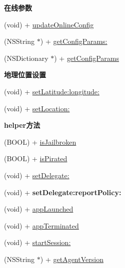\begin{Indent}\textbf{ 在线参数}\par
{\em 

 

 }\begin{DoxyCompactItemize}
\item 
(void) + \hyperlink{interfaceMobClick_a5aff901d6282cd004ce00db11000c3e0}{update\+Online\+Config}
\item 
(N\+S\+String $\ast$) + \hyperlink{interfaceMobClick_ad1a63bdab1a21d495a767929d41cf0ef}{get\+Config\+Params\+:}
\item 
(N\+S\+Dictionary $\ast$) + \hyperlink{interfaceMobClick_acb35b949d01928173c62c3c4d9e53dcb}{get\+Config\+Params}
\end{DoxyCompactItemize}
\end{Indent}
\begin{Indent}\textbf{ 地理位置设置}\par
{\em 

 

 }\begin{DoxyCompactItemize}
\item 
(void) + \hyperlink{interfaceMobClick_a4ce5e71d41f3cd6f36ccf5f019310abc}{set\+Latitude\+:longitude\+:}
\item 
(void) + \hyperlink{interfaceMobClick_a2eb5a69a23b42b0ca81be91ca6bb2dad}{set\+Location\+:}
\end{DoxyCompactItemize}
\end{Indent}
\begin{Indent}\textbf{ helper方法}\par
{\em 

 

 }\begin{DoxyCompactItemize}
\item 
(B\+O\+OL) + \hyperlink{interfaceMobClick_ae7c6a5472047a7b1c4173d291c3bea8e}{is\+Jailbroken}
\item 
(B\+O\+OL) + \hyperlink{interfaceMobClick_ae04aba448c037bb205c18f9d4e7bc0f0}{is\+Pirated}
\item 
(void) + \hyperlink{interfaceMobClick_acc2fa4f98ba0717fb6ac965f94d57d5f}{set\+Delegate\+:}
\item 
\mbox{\label{interfaceMobClick_aeeef4402f410cff401d0dbc63916fbfc}} 
(void) + {\bfseries set\+Delegate\+:report\+Policy\+:}
\item 
(void) + \hyperlink{interfaceMobClick_a5173b1e6c774c7add2fac86a78290308}{app\+Launched}
\item 
(void) + \hyperlink{interfaceMobClick_a29f8bb03081a087c827873118d7d807e}{app\+Terminated}
\item 
(void) + \hyperlink{interfaceMobClick_a315c097059ad7c61bd0deb945c5b8c8f}{start\+Session\+:}
\item 
(N\+S\+String $\ast$) + \hyperlink{interfaceMobClick_a8f2f2903913ccbc5a2ee49d6c2b0b6e3}{get\+Agent\+Version}
\end{DoxyCompactItemize}
\end{Indent}


